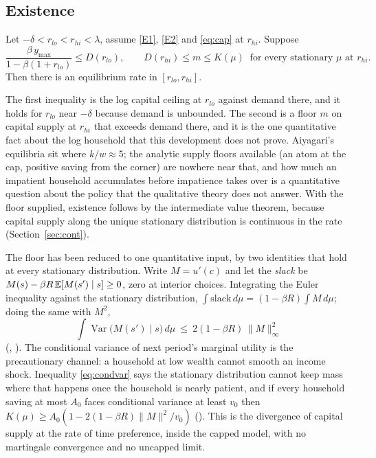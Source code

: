 \subsection{Existence}\label{sec:exist}

\begin{theorem}\label{thm:exist}
Let $-\delta<r_{lo}<r_{hi}<\lambda$, assume \ref{E1}, \ref{E2} and \eqref{eq:cap} at $r_{hi}$.
Suppose
\[
  \frac{\beta\,y_{\max}}{1-\beta(1+r_{lo})}\le D(r_{lo}),\qquad
  D(r_{hi})\le m\le K(\mu)\ \text{ for every stationary }\mu\text{ at }r_{hi}.
\]
Then there is an equilibrium rate in $[r_{lo},r_{hi}]$.
\end{theorem}

The first inequality is the log capital ceiling at $r_{lo}$ against demand there, and it holds
for $r_{lo}$ near $-\delta$ because demand is unbounded. The second is a floor $m$ on capital
supply at $r_{hi}$ that exceeds demand there, and it is the one quantitative fact about the log
household that this development does not prove. Aiyagari's equilibria sit where $k/w\approx5$; the
analytic supply floors available (an atom at the cap, positive saving from the corner) are nowhere
near that, and how much an impatient household accumulates before impatience takes over is a
quantitative question about the policy that the qualitative theory does not answer. With the floor
supplied, existence follows by the intermediate value theorem, because capital supply along the
unique stationary distribution is continuous in the rate (Section~\ref{sec:cont}).

The floor has been reduced to one quantitative input, by two identities that hold at every
stationary distribution. Write $M=u'(c)$ and let the \emph{slack} be
$M(s)-\beta R\,\mathbb{E}[M(s')\mid s]\ge0$, zero at interior choices. Integrating the Euler inequality
against the stationary distribution, $\int \mathrm{slack}\,d\mu=(1-\beta R)\int M\,d\mu$; doing the
same with $M^2$,
\begin{equation}\label{eq:condvar}
  \int \operatorname{Var}\bigl(M(s')\mid s\bigr)\,d\mu\ \le\ 2(1-\beta R)\,\|M\|_\infty^2
\end{equation}
(, ). The conditional variance of next
period's marginal utility is the precautionary channel: a household at low wealth cannot smooth an
income shock. Inequality \eqref{eq:condvar} says the stationary distribution cannot keep mass
where that happens once the household is nearly patient, and if every household saving at most
$A_0$ faces conditional variance at least $v_0$ then $K(\mu)\ge A_0(1-2(1-\beta R)\|M\|^2/v_0)$
(). This is the divergence of capital supply at the rate
of time preference, inside the capped model, with no martingale convergence and no uncapped
limit.

